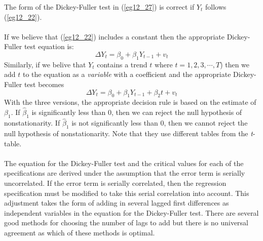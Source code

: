 \documentclass[11pt]{article}
\begin{document}
The form of the Dickey-Fuller test in (\ref{eg12_27}) is correct if $Y_t$ follows (\ref{eg12_22}).\\ \\
If we believe that (\ref{eg12_22}) includes a constant then the appropriate Dickey-Fuller test equation is:
\begin{equation}
\Delta Y_t =\beta_0 +\beta_1Y_{t-1} + v_t \label{eg12_28}
\end{equation}
Similarly, if we belive that $Y_t$ contains a trend $t$ where $t=1,2,3,\cdots,T$) then we add $t$ to the equation as a \textit{variable} with a coefficient and the appropriate Dickey-Fuller test becomes
\begin{equation}
\Delta Y_t =\beta_0 +\beta_1Y_{t-1}+\beta_2t + v_t \label{eg12_29}
\end{equation}
With the three versions, the appropriate decision rule is based on the estimate of $\beta_1$. If $\hat{\beta}_1$ is significantly less than 0, then we can reject the null hypothesis of nonstationarity. If $\hat{\beta}_1$ is not significantly less than 0, then we cannot reject the null hypothesis of nonstationarity. Note that they use different tables from the \textit{t}-table.\\ \\
The equation for the Dickey-Fuller test and the critical values for each of the specifications are derived under the assumption that the error term is serially uncorrelated. If the error term is serially correlated, then the regression specification must be modified to take this serial correlation into account. This adjustment takes the form of adding in several lagged first differences as independent variables in the equation for the Dickey-Fuller test. There are several good methods for choosing the number of lags to add but there is no universal agreement as which of these methods is optimal.
\end{document}
